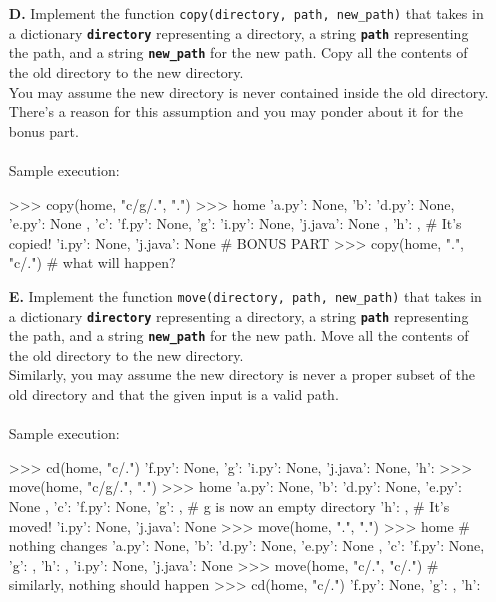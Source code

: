 \begin{enumerate}
\item[\textbf{D.}]
Implement the function \colorbox{CornflowerBlue!20}{\texttt{copy(directory, path, new\_path)}} that takes in a dictionary \texttt{\bfseries directory} representing a directory, 
a string \texttt{\bfseries path} representing the path, and a string \texttt{\bfseries new\_path} for the new path. Copy all the contents of the old directory to the new directory. \\ 
You may assume the new directory is never contained inside the old directory. There's a reason for this assumption and you may ponder about it for the bonus part. \\ \\
Sample execution:
\begin{python}
>>> copy(home, "c/g/.", ".")
>>> home
{
    'a.py': None,
    'b': {
        'd.py': None,
        'e.py': None
    },
    'c': {
        'f.py': None,
        'g': {
            'i.py': None,
            'j.java': None
        },
        'h': {}
    },
    # It's copied!
    'i.py': None, 'j.java': None
}
# BONUS PART
>>> copy(home, ".", "c/.") # what will happen?
\end{python}
\begin{flushright}
    [5 + 2 marks]
\end{flushright}

\item[\textbf{E.}]
Implement the function \colorbox{CornflowerBlue!20}{\texttt{move(directory, path, new\_path)}} that takes in a dictionary \texttt{\bfseries directory} representing a directory, 
a string \texttt{\bfseries path} representing the path, and a string \texttt{\bfseries new\_path} for the new path. Move all the contents of the old directory to the new directory. \\
Similarly, you may assume the new directory is never a proper subset of the old directory and that the given input is a valid path. \\ \\
Sample execution:
\begin{python}
>>> cd(home, "c/.")
{'f.py': None, 'g': {'i.py': None, 'j.java': None}, 'h': {}}
>>> move(home, "c/g/.", ".")
>>> home
{
    'a.py': None,
    'b': {
        'd.py': None,
        'e.py': None
    },
    'c': {
        'f.py': None,
        'g': {}, # g is now an empty directory
        'h': {}
    },
    # It's moved!
    'i.py': None,
    'j.java': None
}
>>> move(home, ".", ".")
>>> home # nothing changes
{
    'a.py': None,
    'b': {
        'd.py': None,
        'e.py': None
    },
    'c': {
        'f.py': None,
        'g': {},
        'h': {}
    },
    'i.py': None,
    'j.java': None
}
>>> move(home, "c/.", "c/.") # similarly, nothing should happen
>>> cd(home, "c/.")
{'f.py': None, 'g': {}, 'h': {}}
\end{python}
\begin{flushright}
    [5 marks]
\end{flushright}
\end{enumerate}

